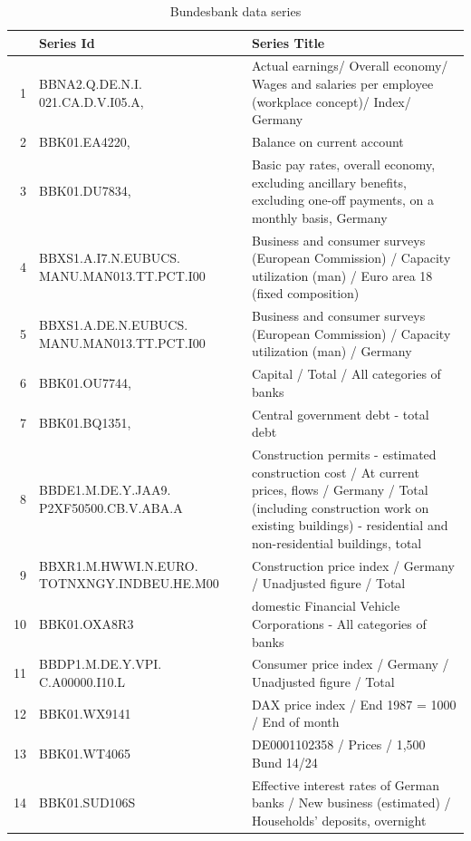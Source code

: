 \documentclass[12pt]{article}
\begin{document}
\begin{table}[ht]
\label{Bundesbank data series}
\caption{Bundesbank data series}
\centering
\begin{tabular}{rp{5cm}p{11cm}}
& \textbf{Series Id} & \textbf{Series Title} \\
  \hline
  \hline
1 & BBNA2.Q.DE.N.I. 021.CA.D.V.I05.A, & Actual earnings/ Overall economy/ Wages and salaries per employee (workplace concept)/ Index/ Germany \\ 
  \hline
  2 & BBK01.EA4220, & Balance on current account \\ 
  \hline
  3 & BBK01.DU7834, & Basic pay rates, overall economy, excluding ancillary benefits, excluding one-off payments, on a monthly basis, Germany \\ 
  \hline
  4 & BBXS1.A.I7.N.EUBUCS. MANU.MAN013.TT.PCT.I00 & Business and consumer surveys (European Commission) / Capacity utilization (man) / Euro area 18 (fixed composition) \\ 
  \hline
  5 & BBXS1.A.DE.N.EUBUCS. MANU.MAN013.TT.PCT.I00 & Business and consumer surveys (European Commission) / Capacity utilization (man) / Germany \\ 
  \hline
  6 & BBK01.OU7744, & Capital / Total / All categories of banks \\ 
  \hline
  7 & BBK01.BQ1351, & Central government debt - total debt \\ 
  \hline
  8 & BBDE1.M.DE.Y.JAA9. P2XF50500.CB.V.ABA.A & Construction permits - estimated construction cost / At current prices, flows / Germany / Total (including construction work on existing buildings) - residential and non-residential buildings, total \\ 
  \hline
  9 & BBXR1.M.HWWI.N.EURO. TOTNXNGY.INDBEU.HE.M00 & Construction price index / Germany / Unadjusted figure / Total \\ 
  \hline
  10 & BBK01.OXA8R3 & domestic Financial Vehicle Corporations - All categories of banks \\ 
  \hline
  11 & BBDP1.M.DE.Y.VPI. C.A00000.I10.L & Consumer price index / Germany / Unadjusted figure / Total \\ 
  \hline
  12 & BBK01.WX9141 & DAX price index / End 1987 = 1000 / End of month \\ 
  \hline
  13 & BBK01.WT4065 & DE0001102358 / Prices / 1,500 Bund 14/24 \\ 
  \hline
  14 & BBK01.SUD106S & Effective interest rates of German banks / New business (estimated) / Households' deposits, overnight \\ 

\end{tabular}
\end{table}
\end{document}

